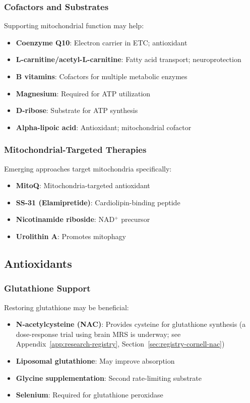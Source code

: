 \subsubsection{Cofactors and Substrates}

Supporting mitochondrial function may help:

\begin{itemize}
    \item \textbf{Coenzyme Q10}: Electron carrier in ETC; antioxidant
    \item \textbf{L-carnitine/acetyl-L-carnitine}: Fatty acid transport; neuroprotection
    \item \textbf{B vitamins}: Cofactors for multiple metabolic enzymes
    \item \textbf{Magnesium}: Required for ATP utilization
    \item \textbf{D-ribose}: Substrate for ATP synthesis
    \item \textbf{Alpha-lipoic acid}: Antioxidant; mitochondrial cofactor
\end{itemize}

\subsubsection{Mitochondrial-Targeted Therapies}

Emerging approaches target mitochondria specifically:

\begin{itemize}
    \item \textbf{MitoQ}: Mitochondria-targeted antioxidant
    \item \textbf{SS-31 (Elamipretide)}: Cardiolipin-binding peptide
    \item \textbf{Nicotinamide riboside}: NAD$^+$ precursor
    \item \textbf{Urolithin A}: Promotes mitophagy
\end{itemize}

\subsection{Antioxidants}

\subsubsection{Glutathione Support}

Restoring glutathione may be beneficial:

\begin{itemize}
    \item \textbf{N-acetylcysteine (NAC)}: Provides cysteine for glutathione synthesis (a dose-response trial using brain MRS is underway; see Appendix~\ref{app:research-registry}, Section~\ref{sec:registry-cornell-nac})
    \item \textbf{Liposomal glutathione}: May improve absorption
    \item \textbf{Glycine supplementation}: Second rate-limiting substrate
    \item \textbf{Selenium}: Required for glutathione peroxidase
\end{itemize}

